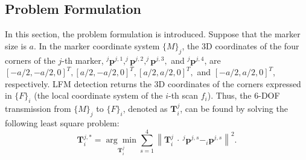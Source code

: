 \subsection{Problem Formulation} \label{5.3}
In this section, the problem formulation is introduced. Suppose that the marker size is $a$. In the marker coordinate system $\{M\}_{j}$, the 3D coordinates of the four corners of the $j$-th marker, $^{j}\mathbf{p}^{j,1},^{j}\mathbf{p}^{j,2},^{j}\mathbf{p}^{j,3},$ and $^{j}\mathbf{p}^{j,4}$, are $[-a/2,-a/2,0]^{T}, [a/2,-a/2,0]^{T}, [a/2,a/2,0]^{T},$ and $[-a/2,a/2,0]^{T}$, respectively. LFM detection returns the 3D coordinates of the corners expressed in $\{F\}_{i}$ (the local coordinate system of the $i$-th scan $f_{i}$).
%
Thus, the 6-DOF transmission from $\{M\}_{j}$ to $\{F\}_{i}$, denoted as $\mathbf{T}^{j}_{i}$, can be found by solving the following least square problem:
 \begin{equation}	
	\mathbf{T}^{j,*}_{i}=\underset{\mathbf{T}^{j}_{i}}{\arg \min } \sum_{s=1}^{4}\left\| \mathbf{T}^{j}_{i} \ \cdot \ ^{j}\mathbf{p}^{j,s}-_{i}\mathbf{p}^{j,s}\right\|^{2}.\label{least3}
\end{equation}

